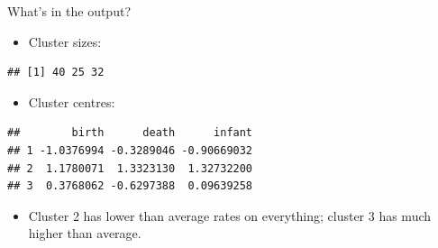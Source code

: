 \documentclass[ignorenonframetext,]{beamer}
\newenvironment{Shaded}{\begin{snugshade}}{\end{snugshade}}
\newcommand{\NormalTok}[1]{#1}
\newcommand{\OperatorTok}[1]{\textcolor[rgb]{0.81,0.36,0.00}{\textbf{#1}}}
\providecommand{\tightlist}{%
  \setlength{\itemsep}{0pt}\setlength{\parskip}{0pt}}
\begin{document}
\begin{frame}[fragile]{What's in the output?}
\protect\hypertarget{whats-in-the-output}{}

\begin{itemize}
\tightlist
\item
  Cluster sizes:
\end{itemize}

\begin{Shaded}
\end{Shaded}

\begin{verbatim}
## [1] 40 25 32
\end{verbatim}

\begin{itemize}
\tightlist
\item
  Cluster centres:
\end{itemize}

\begin{Shaded}
\end{Shaded}

\begin{verbatim}
##        birth      death      infant
## 1 -1.0376994 -0.3289046 -0.90669032
## 2  1.1780071  1.3323130  1.32732200
## 3  0.3768062 -0.6297388  0.09639258
\end{verbatim}

\begin{itemize}
\tightlist
\item
  Cluster 2 has lower than average rates on everything; cluster 3 has
  much higher than average.
\end{itemize}

\end{frame}
\end{document}
